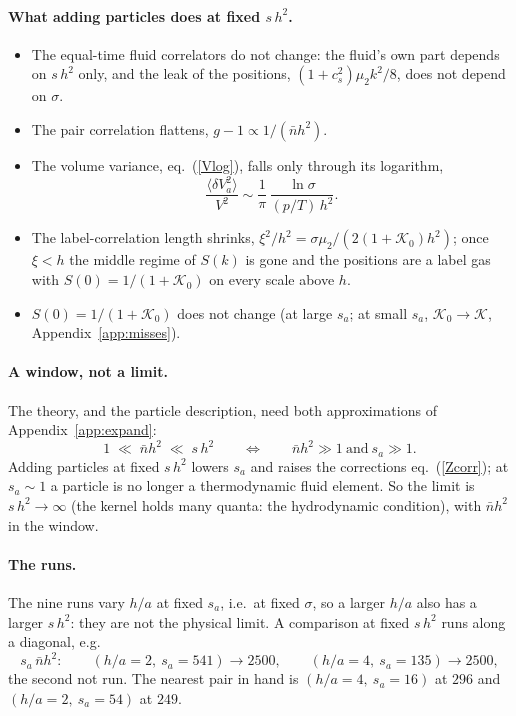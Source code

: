 \documentclass[11pt,aps,preprint,nofootinbib,superscriptaddress,tightenlines]{revtex4-2}
\newcommand{\avg}[1]{\langle #1\rangle}
\def\st{\begin{equation}}
\def\stp{\end{equation}}
\def\Eq#1{eq.~(\ref{#1})}
\def\App#1{Appendix~\ref{#1}}
\let\oldparagraph\paragraph
\renewcommand{\paragraph}{\par\bigskip\oldparagraph}
\begin{document}
\paragraph{What adding particles does at fixed $s\,h^2$.}
\begin{itemize}
\item The equal-time fluid correlators do not change: the fluid's own part depends on $s\,h^2$ only, and the leak of the positions,
  $(1+c_s^2)\mu_2k^2/8$, does not depend on $\sigma$.
\item The pair correlation flattens, $g-1\propto1/(\bar nh^2)$.
\item The volume variance, \Eq{Vlog}, falls only through its logarithm,
  \st
  \frac{\avg{\delta V_a^2}}{V^2}\sim\frac1\pi\,\frac{\ln\sigma}{(p/T)\,h^2} .
  \stp
\item The label-correlation length shrinks, $\xi^2/h^2=\sigma\mu_2/(2(1+\mathcal K_0)h^2)$; once $\xi<h$ the middle regime of $S(k)$ is gone and the positions are a label gas
  with $S(0)=1/(1+\mathcal K_0)$ on every scale above $h$.
\item $S(0)=1/(1+\mathcal K_0)$ does not change (at large $s_a$; at small $s_a$, $\mathcal K_0\to\mathcal K$, \App{app:misses}).
\end{itemize}

\paragraph{A window, not a limit.}  The theory, and the particle description, need both approximations of \App{app:expand}:
\st
1\;\ll\;\bar nh^2\;\ll\;s\,h^2\qquad\Longleftrightarrow\qquad \bar nh^2\gg1\ \text{and}\ s_a\gg1 .
\stp
Adding particles at fixed $s\,h^2$ lowers $s_a$ and raises the corrections \Eq{Zcorr}; at $s_a\sim1$ a particle is no longer a thermodynamic fluid element.
So the limit is $s\,h^2\to\infty$ (the kernel holds many quanta: the hydrodynamic condition), with $\bar nh^2$ in the window.

\paragraph{The runs.}  The nine runs vary $h/a$ at fixed $s_a$, i.e.\ at fixed $\sigma$, so a larger $h/a$ also has a larger $s\,h^2$: they are not
the physical limit.  A comparison at fixed $s\,h^2$ runs along a diagonal, e.g.
\st
s_a\,\bar nh^2:\qquad (h/a=2,\ s_a=541)\to2500,\qquad (h/a=4,\ s_a=135)\to2500,
\stp
the second not run.  The nearest pair in hand is $(h/a=4,\ s_a=16)$ at $296$ and $(h/a=2,\ s_a=54)$ at $249$.
\end{document}
